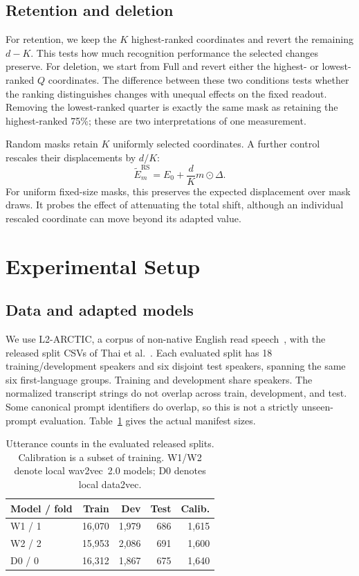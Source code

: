 \documentclass{article}
\begin{document}
\subsection{Retention and deletion}
For retention, we keep the $K$ highest-ranked coordinates and revert the remaining $d-K$. This tests how much recognition performance the selected changes preserve. For deletion, we start from Full and revert either the highest- or lowest-ranked $Q$ coordinates. The difference between these two conditions tests whether the ranking distinguishes changes with unequal effects on the fixed readout. Removing the lowest-ranked quarter is exactly the same mask as retaining the highest-ranked 75\%; these are two interpretations of one measurement.

Random masks retain $K$ uniformly selected coordinates. A further control rescales their displacements by $d/K$:
\begin{equation}
 \widetilde E^{\mathrm{RS}}_m=E_0+\frac{d}{K}m\odot\Delta.
 \label{eq:rescale}
\end{equation}
For uniform fixed-size masks, this preserves the expected displacement over mask draws. It probes the effect of attenuating the total shift, although an individual rescaled coordinate can move beyond its adapted value.

\section{Experimental Setup}
\label{sec:setup}
\subsection{Data and adapted models}
We use L2-ARCTIC, a corpus of non-native English read speech~\cite{zhao2018l2arctic}, with the released split CSVs of Thai et al.~\cite{thai2026contrastive}. Each evaluated split has 18 training/development speakers and six disjoint test speakers, spanning the same six first-language groups. Training and development share speakers. The normalized transcript strings do not overlap across train, development, and test. Some canonical prompt identifiers do overlap, so this is not a strictly unseen-prompt evaluation. Table~\ref{tab:data} gives the actual manifest sizes.

\begin{table}[t]
\centering
\caption{Utterance counts in the evaluated released splits. Calibration is a subset of training. W1/W2 denote local wav2vec~2.0 models; D0 denotes local data2vec.}
\label{tab:data}
\begin{tabular}{lrrrr}
\toprule
Model / fold & Train & Dev & Test & Calib.\\
\midrule
W1 / 1 & 16,070 & 1,979 & 686 & 1,615\\
W2 / 2 & 15,953 & 2,086 & 691 & 1,600\\
D0 / 0 & 16,312 & 1,867 & 675 & 1,640\\
\bottomrule
\end{tabular}
\end{table}
\end{document}
